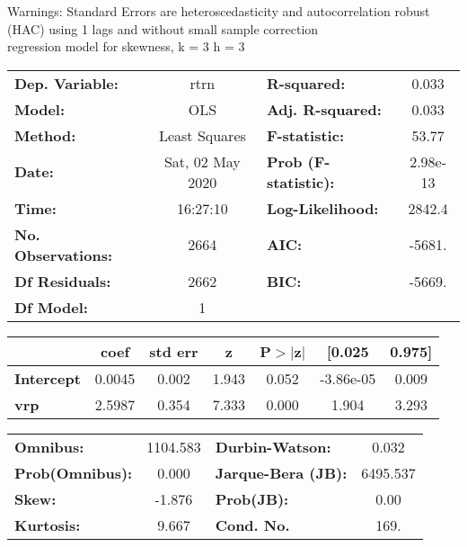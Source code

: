 Warnings: \newline
 [1] Standard Errors are heteroscedasticity and autocorrelation robust (HAC) using 1 lags and without small sample correction\\ 

regression model for skewness, k = 3 h = 3\begin{center}
\begin{tabular}{lclc}
\toprule
\textbf{Dep. Variable:}    &       rtrn       & \textbf{  R-squared:         } &     0.033   \\
\textbf{Model:}            &       OLS        & \textbf{  Adj. R-squared:    } &     0.033   \\
\textbf{Method:}           &  Least Squares   & \textbf{  F-statistic:       } &     53.77   \\
\textbf{Date:}             & Sat, 02 May 2020 & \textbf{  Prob (F-statistic):} &  2.98e-13   \\
\textbf{Time:}             &     16:27:10     & \textbf{  Log-Likelihood:    } &    2842.4   \\
\textbf{No. Observations:} &        2664      & \textbf{  AIC:               } &    -5681.   \\
\textbf{Df Residuals:}     &        2662      & \textbf{  BIC:               } &    -5669.   \\
\textbf{Df Model:}         &           1      & \textbf{                     } &             \\
\bottomrule
\end{tabular}
\begin{tabular}{lcccccc}
                   & \textbf{coef} & \textbf{std err} & \textbf{z} & \textbf{P$> |$z$|$} & \textbf{[0.025} & \textbf{0.975]}  \\
\midrule
\textbf{Intercept} &       0.0045  &        0.002     &     1.943  &         0.052        &    -3.86e-05    &        0.009     \\
\textbf{vrp}       &       2.5987  &        0.354     &     7.333  &         0.000        &        1.904    &        3.293     \\
\bottomrule
\end{tabular}
\begin{tabular}{lclc}
\textbf{Omnibus:}       & 1104.583 & \textbf{  Durbin-Watson:     } &    0.032  \\
\textbf{Prob(Omnibus):} &   0.000  & \textbf{  Jarque-Bera (JB):  } & 6495.537  \\
\textbf{Skew:}          &  -1.876  & \textbf{  Prob(JB):          } &     0.00  \\
\textbf{Kurtosis:}      &   9.667  & \textbf{  Cond. No.          } &     169.  \\
\bottomrule
\end{tabular}
\end{center}

